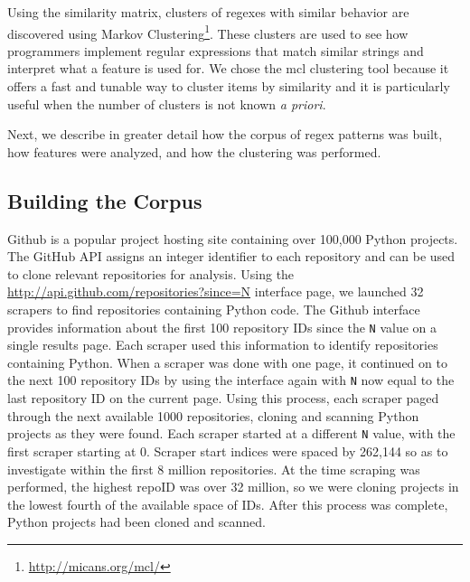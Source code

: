 Using the similarity matrix, clusters of regexes with similar behavior are discovered using Markov Clustering\footnote{\url{http://micans.org/mcl/}}.  These clusters are used to see how programmers implement regular expressions that match similar strings and interpret what a feature is used for.
 We chose the mcl clustering tool because it offers a fast and tunable way to cluster items by similarity and it is particularly useful when the number of clusters is not known \emph{a priori}.


Next, we describe in greater detail how the corpus of regex patterns was built, how features were analyzed, and how the clustering was performed.




\subsection{Building the Corpus}
\label{study:corpus}
Github is a popular project hosting site containing over 100,000 Python projects.  The GitHub API assigns an integer identifier to each repository and can be used to clone relevant repositories for analysis.  Using the \url{http://api.github.com/repositories?since=N} interface page, we launched 32 scrapers to find repositories containing Python code.  The Github interface provides information about the first 100 repository IDs since the {\tt N} value on a single results page.  Each scraper used this information to identify repositories containing Python.  When a scraper was done with one page, it continued on to the next 100 repository IDs by using the interface again with {\tt N} now equal to the last repository ID on the current page.  Using this process, each scraper paged through the next available 1000 repositories, cloning and scanning Python projects as they were found.  Each scraper started at a different {\tt N} value, with the first scraper starting at 0.  Scraper start indices were spaced by 262,144 so as to investigate within the first 8 million repositories.  At the time scraping was performed, the highest repoID was over 32 million, so we were cloning projects in the lowest fourth of the available space of IDs.  After this process was complete,  Python projects had been cloned and scanned.

